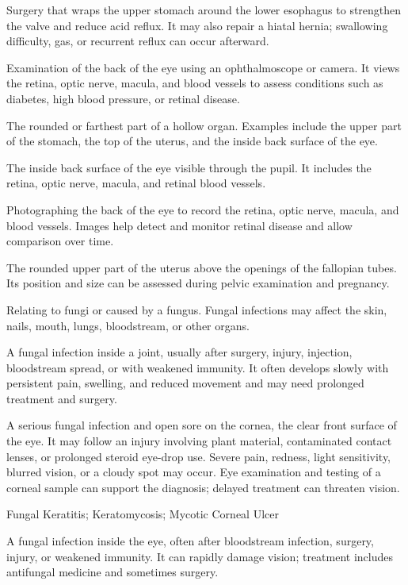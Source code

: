  Surgery that wraps the upper stomach around the lower esophagus to strengthen the valve and reduce acid reflux. It may also repair a hiatal hernia; swallowing difficulty, gas, or recurrent reflux can occur afterward.

 Examination of the back of the eye using an ophthalmoscope or camera. It views the retina, optic nerve, macula, and blood vessels to assess conditions such as diabetes, high blood pressure, or retinal disease.

 The rounded or farthest part of a hollow organ. Examples include the upper part of the stomach, the top of the uterus, and the inside back surface of the eye.

 The inside back surface of the eye visible through the pupil. It includes the retina, optic nerve, macula, and retinal blood vessels.

 Photographing the back of the eye to record the retina, optic nerve, macula, and blood vessels. Images help detect and monitor retinal disease and allow comparison over time.

 The rounded upper part of the uterus above the openings of the fallopian tubes. Its position and size can be assessed during pelvic examination and pregnancy.

 Relating to fungi or caused by a fungus. Fungal infections may affect the skin, nails, mouth, lungs, bloodstream, or other organs.

 A fungal infection inside a joint, usually after surgery, injury, injection, bloodstream spread, or with weakened immunity. It often develops slowly with persistent pain, swelling, and reduced movement and may need prolonged treatment and surgery.

 A serious fungal infection and open sore on the cornea, the clear front surface of the eye. It may follow an injury involving plant material, contaminated contact lenses, or prolonged steroid eye-drop use. Severe pain, redness, light sensitivity, blurred vision, or a cloudy spot may occur. Eye examination and testing of a corneal sample can support the diagnosis; delayed treatment can threaten vision.

\synonyms
Fungal Keratitis; Keratomycosis; Mycotic Corneal Ulcer

 A fungal infection inside the eye, often after bloodstream infection, surgery, injury, or weakened immunity. It can rapidly damage vision; treatment includes antifungal medicine and sometimes surgery.

